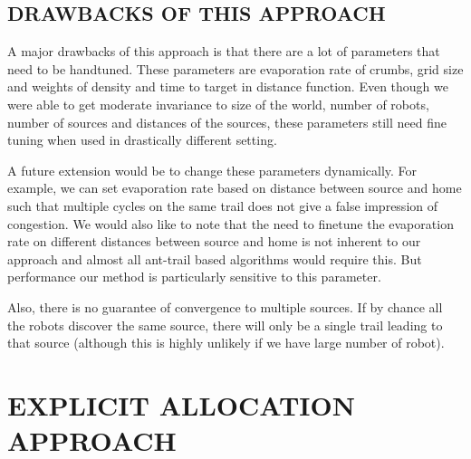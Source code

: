 \documentclass[letterpaper, 10 pt, conference]{ieeeconf}  %
\begin{document}
\subsection{DRAWBACKS OF THIS APPROACH} \label{ssec:drawbacks_of_1}

A major drawbacks of this approach is that there are a lot of parameters that need to be handtuned. These parameters are evaporation rate of crumbs, grid size and weights of density and time to target in distance function. Even though we were able to get moderate invariance to size of the world, number of robots, number of sources and distances of the sources, these parameters still need fine tuning when used in drastically different setting.

A future extension would be to change these parameters dynamically. For example, we can set evaporation rate based on distance between source and home such that multiple cycles on the same trail does not give a false impression of congestion. We would also like to note that the need to finetune the evaporation rate on different distances between source and home is not inherent to our approach and almost all ant-trail based algorithms would require this. But  performance our method is particularly sensitive to this parameter.

Also, there is no guarantee of convergence to multiple sources. If by chance all the robots discover the same source, there will only be a single trail leading to that source (although this is highly unlikely if we have large number of robot).

\section{EXPLICIT ALLOCATION APPROACH} 
\end{document}
